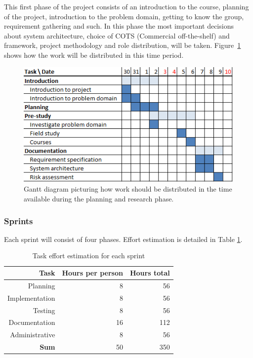 This first phase of the project consists of an introduction to the course,
planning of the project, introduction to the problem domain, getting to know
the group, requirement gathering and such. In this phase the most important
decisions about system architecture, choice of COTS (Commercial off-the-shelf) and framework, project
methodology and role distribution, will be taken. Figure~\ref{gantt:pre_imp}
shows how the work will be distributed in this time period.

\begin{figure}[h]
\centering
  \includegraphics[width=1.0\textwidth]{project_management/pre_implementation_gantt}
  \caption[Gantt chart of planning and research phase]{Gantt diagram picturing how work should be distributed in the time available during the planning and research phase.}
  \label{gantt:pre_imp}
\end{figure}

\subsubsection{Sprints}

Each sprint will consist of four phases. Effort estimation is
detailed in Table \ref{Sprint effort estimation}.

\begin{table}[htbp]
\begin{center}
  \begin{tabular}{|r|r|r|}
    \hline
    \bf{Task} & \bf{Hours per person} & \bf{Hours total} \\
    \hline
    Planning & 8 & 56 \\
    Implementation & 8 & 56 \\
    Testing & 8 & 56 \\
    Documentation & 16 & 112 \\
    Administrative & 8 & 56 \\
    \hline \hline
    \bf{Sum} & 50 & 350 \\
    \hline
  \end{tabular}
  \caption{Task effort estimation for each sprint}
  \label{Sprint effort estimation}
\end{center}
\end{table}

